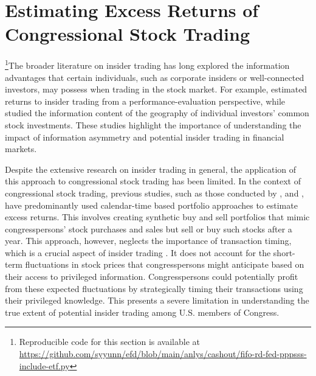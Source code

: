 \documentclass[15pt,letterpaper]{article}
\begin{document}


\section{Estimating Excess Returns of Congressional Stock Trading} \label{ex-r}

\footnote{Reproducible code for this section is available at \url{https://github.com/syyunn/efd/blob/main/anlys/cashout/fifo-rd-fed-pppsss-include-etf.py}}The broader literature on insider trading has long explored the information advantages that certain individuals, such as corporate insiders or well-connected investors, may possess when trading in the stock market. For example, \cite{jeng2003} estimated returns to insider trading from a performance-evaluation perspective, while \cite{ivkovic2005} studied the information content of the geography of individual investors' common stock investments. These studies highlight the importance of understanding the impact of information asymmetry and potential insider trading in financial markets.

Despite the extensive research on insider trading in general, the application of this approach to congressional stock trading has been limited. In the context of congressional stock trading, previous studies, such as those conducted by \cite{zi24}, \cite{zi11} and \cite{eg13}, have predominantly used calendar-time based portfolio approaches \citep{hdz07} to estimate excess returns. This involves creating synthetic buy and sell portfolios \citep{syn1,syn2} that mimic congresspersons' stock purchases and sales but sell or buy such stocks after a year. 
  This approach, however, neglects the importance of transaction timing, which is a crucial aspect of insider trading \citep{tahoun2014,schweizer2011}. It does not account for the short-term fluctuations in stock prices that congresspersons might anticipate based on their access to privileged information. Congresspersons could potentially profit from these expected fluctuations by strategically timing their transactions using their privileged knowledge.  This presents a severe limitation in understanding the true extent of potential insider trading among U.S. members of Congress.
\end{document}

